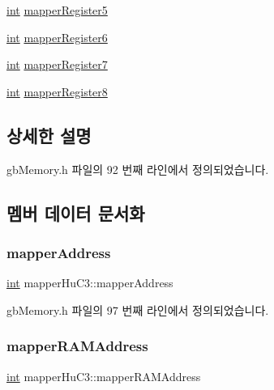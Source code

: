 \begin{DoxyCompactItemize}
\mbox{\hyperlink{_util_8cpp_a0ef32aa8672df19503a49fab2d0c8071}{int}} \mbox{\hyperlink{structmapper_hu_c3_ad72bed2f2b497e68ff30c70f8105c03a}{mapper\+Register5}}
\item 
\mbox{\hyperlink{_util_8cpp_a0ef32aa8672df19503a49fab2d0c8071}{int}} \mbox{\hyperlink{structmapper_hu_c3_a5dace14f152956810d188d6b08ca0739}{mapper\+Register6}}
\item 
\mbox{\hyperlink{_util_8cpp_a0ef32aa8672df19503a49fab2d0c8071}{int}} \mbox{\hyperlink{structmapper_hu_c3_a3d611f8b421806dd7b684dc6c6859107}{mapper\+Register7}}
\item 
\mbox{\hyperlink{_util_8cpp_a0ef32aa8672df19503a49fab2d0c8071}{int}} \mbox{\hyperlink{structmapper_hu_c3_a7a22f2e1258e8b5c86e359ffd54eef85}{mapper\+Register8}}
\end{DoxyCompactItemize}


\subsection{상세한 설명}


gb\+Memory.\+h 파일의 92 번째 라인에서 정의되었습니다.



\subsection{멤버 데이터 문서화}
\mbox{\label{structmapper_hu_c3_ad4b565c84b6f4900210d9d7cf717e208}} 
\subsubsection{\texorpdfstring{mapper\+Address}{mapperAddress}}
{\footnotesize\ttfamily \mbox{\hyperlink{_util_8cpp_a0ef32aa8672df19503a49fab2d0c8071}{int}} mapper\+Hu\+C3\+::mapper\+Address}



gb\+Memory.\+h 파일의 97 번째 라인에서 정의되었습니다.

\mbox{\label{structmapper_hu_c3_a4cf3e58fe7b61a1a718114cad6fde78d}} 
\subsubsection{\texorpdfstring{mapper\+R\+A\+M\+Address}{mapperRAMAddress}}
{\footnotesize\ttfamily \mbox{\hyperlink{_util_8cpp_a0ef32aa8672df19503a49fab2d0c8071}{int}} mapper\+Hu\+C3\+::mapper\+R\+A\+M\+Address}



